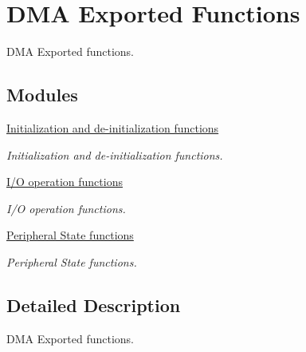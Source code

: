 \hypertarget{group___d_m_a___exported___functions}{}\section{D\+MA Exported Functions}
\label{group___d_m_a___exported___functions}


D\+MA Exported functions.  


\subsection*{Modules}
\begin{DoxyCompactItemize}
\item 
\hyperlink{group___d_m_a___exported___functions___group1}{Initialization and de-\/initialization functions}
\begin{DoxyCompactList}\small\item\em Initialization and de-\/initialization functions. \end{DoxyCompactList}\item 
\hyperlink{group___d_m_a___exported___functions___group2}{I/\+O operation functions}
\begin{DoxyCompactList}\small\item\em I/O operation functions. \end{DoxyCompactList}\item 
\hyperlink{group___d_m_a___exported___functions___group3}{Peripheral State functions}
\begin{DoxyCompactList}\small\item\em Peripheral State functions. \end{DoxyCompactList}\end{DoxyCompactItemize}


\subsection{Detailed Description}
D\+MA Exported functions. 

